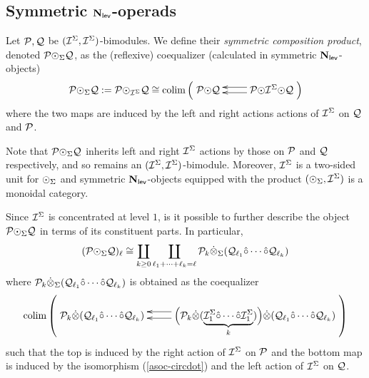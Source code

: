 \subsection{Symmetric $\mathbf{N}_{\mathsf{lev}}$-operads}

\begin{definition} Let $\mathcal{P},\mathcal{Q}$ be $(\mathcal{I}^{\Sigma},\mathcal{I}^{\Sigma})$-bimodules. We define their \textit{symmetric composition product}, denoted $\mathcal{P}{\odot}_{\Sigma} \mathcal{Q}$, as the (reflexive) coequalizer (calculated in symmetric $\mathbf{N}_{\mathsf{lev}}$-objects)\[ 
    \Cal{P}\circdot_{\Sigma} \Cal{Q} :=\Cal{P}\circdot_{\Cal{I}^{\Sigma}} \Cal{Q}\cong \colim \left( \xymatrix{
        \Cal{P}\circdot \Cal{Q} &
        \Cal{P}\circdot \Cal{I}^{\Sigma} \circdot \Cal{Q} \ar@<.5ex>[l] \ar@<-.75ex>[l] }
    \right) \]
where the two maps are induced by the left and right actions actions of $\mathcal{I}^{\Sigma}$ on $\mathcal{Q}$ and $\mathcal{P}$.
\end{definition}

Note that $\mathcal{P}{\odot}_{\Sigma} \mathcal{Q}$ inherits left and right $\mathcal{I}^{\Sigma}$ actions by those on $\mathcal{P}$ and $\mathcal{Q}$ respectively, and so remains an $(\mathcal{I}^{\Sigma},\mathcal{I}^{\Sigma})$-bimodule. Moreover, $\mathcal{I}^{\Sigma}$ is a two-sided unit for ${\odot}_{\Sigma}$ and symmetric $\mathbf{N}_{\mathsf{lev}}$-objects equipped with the product $({\odot}_{\Sigma}, \mathcal{I}^{\Sigma})$ is a monoidal category. 
\begin{remark}
Since $\mathcal{I}^{\Sigma}$ is concentrated at level $1$, is it possible to further describe the object $\mathcal{P}{\odot}_{\Sigma} \mathcal{Q}$ in terms of its constituent parts. In particular, \begin{equation*}
    (\mathcal{P}{\odot}_{\Sigma} \mathcal{Q})_{\ell} \cong \coprod_{k\geq 0} \coprod_{\ell_1+\dots+\ell_k=\ell} \mathcal{P}_{k} \dot{\otimes}_{\Sigma} ( \mathcal{Q}_{\ell_1}\hat{\circ} \cdots \hat{\circ} \mathcal{Q}_{\ell_k})
\end{equation*}
where $\mathcal{P}_{k} \dot{\otimes}_{\Sigma} ( \mathcal{Q}_{\ell_1}\hat{\circ} \cdots \hat{\circ} \mathcal{Q}_{\ell_k})$ is obtained as the coequalizer \begin{equation*}
    \colim \left( \xymatrix{
        \Cal{P}_k \tensordot (\Cal{Q}_{\ell_1}\circhat \cdots \circhat \Cal{Q}_{\ell_k}) &
        \Big( \Cal{P}_k \tensordot (\underbrace{\Isym_1 \circhat \cdots \circhat \Isym_1}_k) \Big) \tensordot  (\Cal{Q}_{\ell_1}\circhat \cdots \circhat \Cal{Q}_{\ell_k}) \ar@<-1ex>[l] \ar@<.5ex>[l]
    } \right) 
\end{equation*}
such that the top is induced by the right action of $\mathcal{I}^{\Sigma}$ on $\mathcal{P}$ and the bottom map is induced by the isomorphism (\ref{asoc-circdot}) and the left action of $\mathcal{I}^{\Sigma}$ on $\mathcal{Q}$.
\end{remark}

